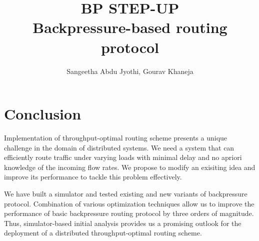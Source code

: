 \documentclass[12pt, a4paper, twocolumn]{article}
\begin{document}
\title{\bf{BP STEP-UP \\ Backpressure-based routing protocol}}
\author{Sangeetha Abdu Jyothi, Gourav Khaneja}
\date{}
\maketitle






%


\section{Conclusion}
Implementation of throughput-optimal routing scheme presents a unique challenge in the domain of distributed systems. We need a system that can efficiently route traffic under varying loads with minimal delay and no apriori knowledge of the incoming flow rates. We propose to modify an exisiting idea and improve its performance to tackle this problem effectively.

We have built a simulator and tested existing and new variants of backpressure protocol. Combination of various optimization techniques allow us to improve the performance of basic backpressure routing protocol by three orders of magnitude. Thus, simulator-based initial analysis provides us a promising outlook for the deployment of a distributed throughput-optimal routing scheme. 
%


\end{document}
